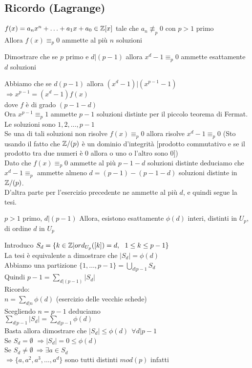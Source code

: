 \documentclass[12px]{article}
\begin{document}
{	\subsection{Ricordo (Lagrange)}
	$f(x) = a_nx^n + \ldots + a_1 x + a_0\in \mathbb{Z}[x]$ tale che $a_n \not\equiv_p 0$ con  $p > 1$ primo \\
	Allora  $f(x)\equiv_p 0$ ammette al più  $n$ soluzioni
	\begin{coro}
	Dimostrare che se $p$ primo e $d | (p-1)$ allora  $x^d -1 \equiv_p 0$ ammette esattamente  $d $ soluzioni
\end{coro}
\begin{dimo}[Soluzione]
	Abbiamo che se $d  (p-1)$ allora $(x^d -1) | (x^{p-1} - 1)$\\
	$  \Rightarrow x^{p-1} = (x^d-1)f(x)$\\
	dove $f$ è di grado $(p-1-d)$ \\
	Ora  $x^{p-1}\equiv_p 1$ ammette  $p-1$ soluzioni distinte per il piccolo teorema di Fermat. Le soluzioni sono  $1,2,\ldots, p-1$\\
	Se una di tali soluzioni non risolve  $f(x)\equiv_p 0$ allora risolve  $x^d-1\equiv_p 0$ (Sto usando il fatto che  $\mathbb{Z}/(p)$ è un dominio d'integrità [prodotto commutativo e se il prodotto tra due numeri è 0 allora o uno o l'altro sono 0])\\
	Dato che $ f(x)\equiv_p 0$ ammette al più $p-1-d$ soluzioni distinte deduciamo che $x^d - 1\equiv_p$ ammette almeno $d = (p-1)-(p-1-d)$ soluzioni distinte in  $\mathbb{Z}/(p)$.\\
	D'altra parte per l'esercizio precedente ne ammette al più $d$, e quindi segue la tesi.
\end{dimo}
\begin{coro}[Esercizio]
	$p> 1$ primo, $d | (p-1)$ Allora, esistono esattamente $\phi(d)$ interi, distinti in $U_p$, di ordine $d$ in $U_p$
\end{coro}
\begin{dimo}[Soluzione]
	Introduco $S_d = \{k\in \mathbb{Z} | ord_{U_p}([k]) = d, \ \ 1\leq k\leq p-1\}$\\
	La tesi è equivalente a dimostrare che  $|S_d| = \phi(d)$\\
	Abbiamo una partizione  $\displaystyle\{1,\ldots, p-1\}=\bigcup_{d|p-1}S_d$\\
	Quindi $\displaystyle p-1 = \sum_{d|(p-1)}|S_d|$\\
	Ricordo:\\
	$n = \sum_{d|n} \phi(d)$ (esercizio delle vecchie schede)\\
	Scegliendo $n = p-1$ deduciamo\\
	$\displaystyle \sum_{d|p-1}|S_d| = \sum_{d|p-1} \phi(d)$\\
	Basta allora dimostrare che $|S_d|\leq \phi(d) \ \ \forall d|p-1$\\
	Se $S_d = \emptyset$ $ \Rightarrow |S_d| = 0\leq \phi(d)$ \\
	Se $S_d\neq \emptyset \ \Rightarrow \exists a\in S_d$\\
	$ \Rightarrow \{a, a^2, a^3, \ldots, a^d\}$ sono tutti distinti  $mod(p)$ infatti \\
	\begin{center}
		

\end{center}
\end{dimo}}
\end{document}
